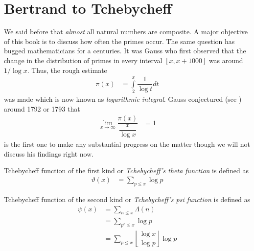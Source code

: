\documentclass[elemannt.tex]{subfile}
\begin{document}
	\chapter{Bertrand to Tchebycheff}
	We said before that \textit{almost} all natural numbers are composite. A major objective of this book is to discuss how often the primes occur. The same question has bugged mathematicians for a centuries. It was Gauss who first observed that the change in the distribution of primes in every interval $[x,x+1000]$ was around $1/\log{x}$. Thus, the rough estimate
		\begin{align*}
			\pi(x)
				& = \int\limits_{2}^{x}\dfrac{1}{\log{t}}dt
		\end{align*}
	was made which is now known as \textit{logarithmic integral}. Gauss conjectured (see \textcite[Page 37]{landau_1911}) around 1792 or 1793 that
		\begin{align*}
			\lim\limits_{x\to\infty}\dfrac{\pi(x)}{\dfrac{x}{\log{x}}}
				& = 1
		\end{align*}
	\textcite{tchebycheff_1852} is the first one to make any substantial progress on the matter though we will not discuss his findings right now.
		\begin{definition}
			Tchebycheff function of the first kind or \textit{Tchebycheff's theta function} is defined as
				\begin{align*}
					\vartheta(x)
						& = \sum_{p\leq x}\log{p}
				\end{align*}
		\end{definition}

		\begin{definition}
			Tchebycheff function of the second kind or \textit{Tchebycheff's psi function} is defined as
				\begin{align*}
					\psi(x)
						& = \sum_{n\leq x}\Lambda(n)\\
						& = \sum_{p^{e}\leq x}\log{p}\\
						& = \sum_{p\leq x}\left\lfloor{\dfrac{\log{x}}{\log{p}}}\right\rfloor \log{p}
				\end{align*}
		\end{definition}
\end{document}
